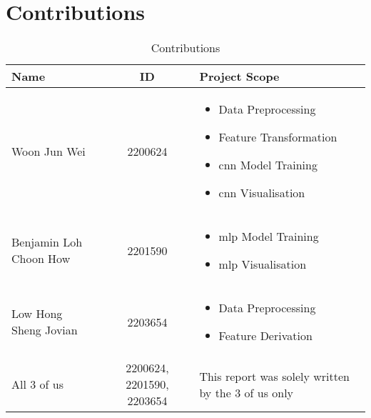 \section{Contributions}\label{contribution}

\begin{table}[htbp]
  \caption{Contributions}\label{tab:contributions}
  \centering
  \begin{tabular}{p{5cm}|c|p{8cm}}
    \hline
    \textbf{Name} & \textbf{ID} & \textbf{Project Scope} \\
    \hline
        Woon Jun Wei & 2200624 &
        \begin{itemize}
            \item Data Preprocessing
            \item Feature Transformation
            \item \gls{cnn} Model Training
            \item \gls{cnn} Visualisation
        \end{itemize}\\
        \hline
        Benjamin Loh Choon How & 2201590 &
        \begin{itemize}
            \item \gls{mlp} Model Training
            \item \gls{mlp} Visualisation
        \end{itemize}\\
        \hline
        Low Hong Sheng Jovian & 2203654 &
        \begin{itemize}
            \item Data Preprocessing
            \item Feature Derivation
        \end{itemize}\\
        \hline
        All 3 of us & 2200624, 2201590, 2203654 & This report was solely written by the 3 of us only\\
        \hline
    \hline
  \end{tabular}
\end{table}